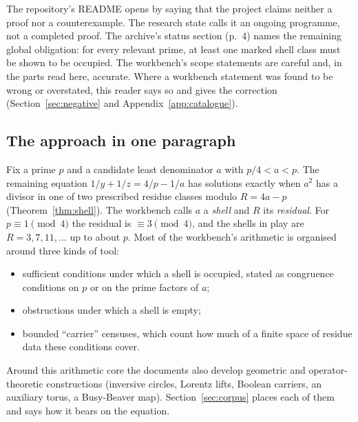 The repository's README opens by saying that the project claims neither a proof nor a counterexample. The research state calls it an ongoing programme, not a completed proof. The archive's status section (p.~4) names the remaining global obligation: for every relevant prime, at least one marked shell class must be shown to be occupied.
The workbench's scope statements are careful and, in the parts read here, accurate. Where a workbench statement was found to be wrong or overstated, this reader says so and gives the correction (Section~\ref{sec:negative} and Appendix~\ref{app:catalogue}).

\subsection{The approach in one paragraph}

Fix a prime $p$ and a candidate least denominator $a$ with $p/4<a<p$. The remaining equation $1/y+1/z=4/p-1/a$ has solutions exactly when $a^2$ has a divisor in one of two prescribed residue classes modulo $R=4a-p$ (Theorem~\ref{thm:shell}). The workbench calls $a$ a \emph{shell} and $R$ its \emph{residual}. For $p\equiv1\pmod4$ the residual is $\equiv3\pmod4$, and the shells in play are $R=3,7,11,\dots$ up to about $p$.
Most of the workbench's arithmetic is organised around three kinds of tool:
\begin{itemize}
\item sufficient conditions under which a shell is occupied, stated as congruence conditions on $p$ or on the prime factors of $a$;
\item obstructions under which a shell is empty;
\item bounded ``carrier'' censuses, which count how much of a finite space of residue data these conditions cover.
\end{itemize}
Around this arithmetic core the documents also develop geometric and operator-theoretic constructions (inversive circles, Lorentz lifts, Boolean carriers, an auxiliary torus, a Busy-Beaver map). Section~\ref{sec:corpus} places each of them and says how it bears on the equation.
